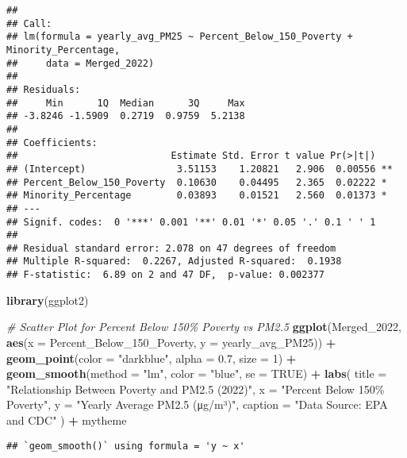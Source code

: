 \documentclass[
]{article}
\newenvironment{Shaded}{\begin{snugshade}}{\end{snugshade}}
\newcommand{\AttributeTok}[1]{\textcolor[rgb]{0.13,0.29,0.53}{#1}}
\newcommand{\CommentTok}[1]{\textcolor[rgb]{0.56,0.35,0.01}{\textit{#1}}}
\newcommand{\ConstantTok}[1]{\textcolor[rgb]{0.56,0.35,0.01}{#1}}
\newcommand{\DecValTok}[1]{\textcolor[rgb]{0.00,0.00,0.81}{#1}}
\newcommand{\FloatTok}[1]{\textcolor[rgb]{0.00,0.00,0.81}{#1}}
\newcommand{\FunctionTok}[1]{\textcolor[rgb]{0.13,0.29,0.53}{\textbf{#1}}}
\newcommand{\NormalTok}[1]{#1}
\newcommand{\SpecialCharTok}[1]{\textcolor[rgb]{0.81,0.36,0.00}{\textbf{#1}}}
\newcommand{\StringTok}[1]{\textcolor[rgb]{0.31,0.60,0.02}{#1}}
\begin{document}
\begin{verbatim}
## 
## Call:
## lm(formula = yearly_avg_PM25 ~ Percent_Below_150_Poverty + Minority_Percentage, 
##     data = Merged_2022)
## 
## Residuals:
##     Min      1Q  Median      3Q     Max 
## -3.8246 -1.5909  0.2719  0.9759  5.2138 
## 
## Coefficients:
##                           Estimate Std. Error t value Pr(>|t|)   
## (Intercept)                3.51153    1.20821   2.906  0.00556 **
## Percent_Below_150_Poverty  0.10630    0.04495   2.365  0.02222 * 
## Minority_Percentage        0.03893    0.01521   2.560  0.01373 * 
## ---
## Signif. codes:  0 '***' 0.001 '**' 0.01 '*' 0.05 '.' 0.1 ' ' 1
## 
## Residual standard error: 2.078 on 47 degrees of freedom
## Multiple R-squared:  0.2267, Adjusted R-squared:  0.1938 
## F-statistic:  6.89 on 2 and 47 DF,  p-value: 0.002377
\end{verbatim}

\begin{Shaded}
\begin{Highlighting}[]
\FunctionTok{library}\NormalTok{(ggplot2)}

\CommentTok{\# Scatter Plot for Percent Below 150\% Poverty vs PM2.5}
\FunctionTok{ggplot}\NormalTok{(Merged\_2022, }\FunctionTok{aes}\NormalTok{(}\AttributeTok{x =}\NormalTok{ Percent\_Below\_150\_Poverty, }\AttributeTok{y =}\NormalTok{ yearly\_avg\_PM25)) }\SpecialCharTok{+}
  \FunctionTok{geom\_point}\NormalTok{(}\AttributeTok{color =} \StringTok{"darkblue"}\NormalTok{, }\AttributeTok{alpha =} \FloatTok{0.7}\NormalTok{, }\AttributeTok{size =} \DecValTok{1}\NormalTok{) }\SpecialCharTok{+}
  \FunctionTok{geom\_smooth}\NormalTok{(}\AttributeTok{method =} \StringTok{"lm"}\NormalTok{, }\AttributeTok{color =} \StringTok{"blue"}\NormalTok{, }\AttributeTok{se =} \ConstantTok{TRUE}\NormalTok{) }\SpecialCharTok{+}
  \FunctionTok{labs}\NormalTok{(}
    \AttributeTok{title =} \StringTok{"Relationship Between Poverty and PM2.5 (2022)"}\NormalTok{,}
    \AttributeTok{x =} \StringTok{"Percent Below 150\% Poverty"}\NormalTok{,}
    \AttributeTok{y =} \StringTok{"Yearly Average PM2.5 (μg/m³)"}\NormalTok{,}
    \AttributeTok{caption =} \StringTok{"Data Source: EPA and CDC"}
\NormalTok{  ) }\SpecialCharTok{+}
\NormalTok{  mytheme}
\end{Highlighting}
\end{Shaded}

\begin{verbatim}
## `geom_smooth()` using formula = 'y ~ x'
\end{verbatim}
\end{document}
